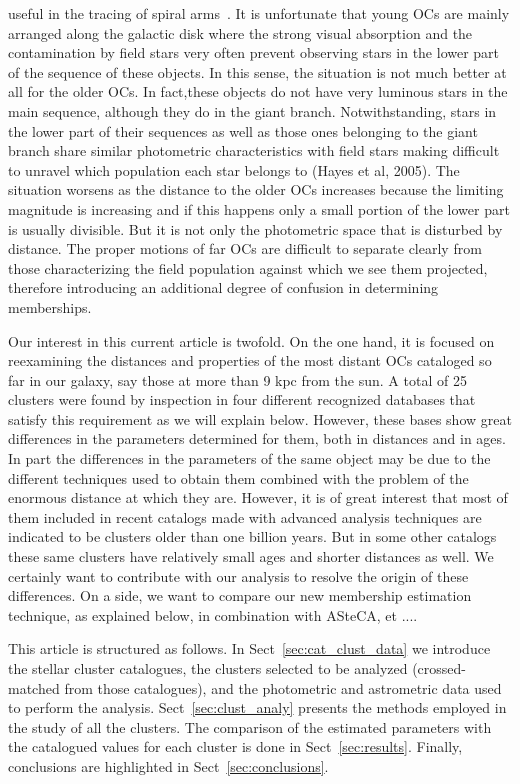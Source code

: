 \documentclass{aa}
\begin{document}
 useful in the tracing of spiral arms~\citep{carraro_2013,Molina_2018}. It is unfortunate that young OCs are mainly arranged along the 
galactic disk where the strong visual absorption and the contamination by 
field stars very often prevent observing stars in the lower part of the sequence of 
these objects. In this sense, the situation is not much better at all for the older OCs. In fact,these objects do not have very luminous stars in the main sequence, although they do in the giant branch. Notwithstanding, stars in the lower part of their sequences as well as those ones belonging to the giant branch share similar photometric characteristics with field stars making difficult to unravel which population each star belongs to (Hayes et al, 2005). 
The situation worsens as the distance to the older OCs increases because the limiting magnitude is increasing and if this happens only a small portion 
of the lower part is usually divisible. But it is not only the photometric space that is disturbed by distance. The proper motions of far OCs are difficult to separate clearly from those characterizing the field population against which we see them projected, therefore introducing an additional degree of confusion in determining memberships.

Our interest in this current article is twofold. On the one hand, it is focused on reexamining the distances
and properties of the most distant OCs cataloged so far in our galaxy, say 
those at more than 9 kpc from the sun. A total of 25 clusters were found by inspection 
in four different recognized databases that satisfy this requirement as we will 
explain below. However, these bases show great differences in the parameters 
determined for them, both in distances and in ages. In part the differences in the 
parameters of the same object may be due to the different techniques used to obtain 
them combined with the problem of the enormous distance at which they are. However, 
it is of great interest that most of them included in recent catalogs made with advanced 
analysis techniques are indicated to be clusters older than one billion years. 
But in some other catalogs these same clusters have relatively small ages and shorter 
distances as well. We certainly want to contribute with our analysis to resolve the 
origin of these differences.
On a side, we want to compare our new membership estimation technique, as explained below, in combination with ASteCA, et ....


 This article is structured as follows. In Sect~\ref{sec:cat_clust_data} we
 introduce the stellar cluster catalogues, the clusters selected to be
 analyzed (crossed-matched from those catalogues), and the photometric and 
 astrometric data used to perform the analysis. Sect~\ref{sec:clust_analy}
 presents the methods employed in the study of all the clusters. The comparison
 of the estimated parameters with the catalogued values for each cluster is done
 in Sect~\ref{sec:results}. Finally, conclusions are highlighted in
 Sect~\ref{sec:conclusions}.
\end{document}
